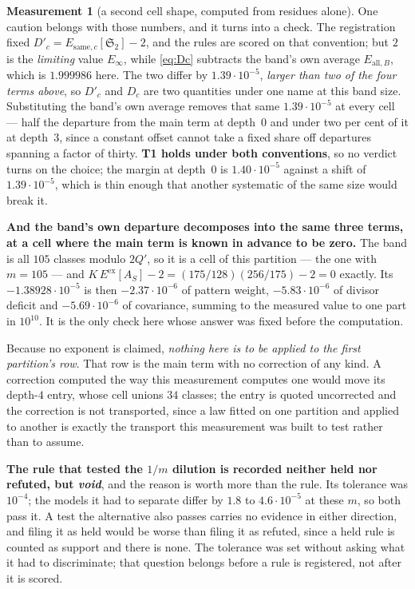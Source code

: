 \documentclass[11pt,a4paper]{article}
\theoremstyle{plain}
\theoremstyle{definition}
\newtheorem{measurement}[theorem]{Measurement}
\theoremstyle{remark}
\renewcommand{\SS}{\mathfrak{S}}
\begin{document}
\begin{measurement}[a second cell shape, computed from residues alone]
One caution belongs with those numbers, and it turns into a check. The
registration fixed $D'_c=E_{\mathrm{same},c}[\SS_2]-2$, and the rules
are scored on that convention; but $2$ is the \emph{limiting} value
$E_\infty$, while \eqref{eq:Dc} subtracts the band's own average
$E_{\mathrm{all},B}$, which is $1.999986$ here. The two differ by
$1.39\cdot10^{-5}$, \emph{larger than two of the four terms above}, so
$D'_c$ and $D_c$ are two quantities under one name at this band size.
Substituting the band's own average removes that same
$1.39\cdot10^{-5}$ at every cell --- half the departure from the main
term at depth~$0$ and under two per cent of it at depth~$3$, since a
constant offset cannot take a fixed share off departures spanning a
factor of thirty. \textbf{T1 holds under both conventions}, so no
verdict turns on the choice; the margin at depth~$0$ is
$1.40\cdot10^{-5}$ against a shift of $1.39\cdot10^{-5}$, which is thin
enough that another systematic of the same size would break it.

\textbf{And the band's own departure decomposes into the same three
terms, at a cell where the main term is known in advance to be zero.}
The band is all $105$ classes modulo $2Q'$, so it is a cell of this
partition --- the one with $m=105$ --- and
$K\,E^{\mathrm{ex}}[A_S]-2=(175/128)(256/175)-2=0$ exactly. Its
$-1.38928\cdot10^{-5}$ is then $-2.37\cdot10^{-6}$ of pattern weight,
$-5.83\cdot10^{-6}$ of divisor deficit and $-5.69\cdot10^{-6}$ of
covariance, summing to the measured value to one part in $10^{10}$.
It is the only check here whose answer was fixed before the
computation.

Because no exponent is claimed, \emph{nothing here is to be applied to
the first partition's row}. That row is the main term with no
correction of any kind. A correction computed the way this measurement
computes one would move its depth-$4$ entry, whose cell unions
$34$ classes; the entry is quoted uncorrected and the correction is not
transported, since a law fitted on one partition and applied to another
is exactly the transport this measurement was built to test rather than
to assume.

\textbf{The rule that tested the $1/m$ dilution is recorded neither
held nor refuted, but \emph{void}}, and the reason is worth more than
the rule. Its tolerance was $10^{-4}$; the models it had to separate
differ by $1.8$ to $4.6\cdot10^{-5}$ at these $m$, so both pass it. A
test the alternative also passes carries no evidence in either
direction, and filing it as held would be worse than filing it as
refuted, since a held rule is counted as support and there is none. The
tolerance was set without asking what it had to discriminate; that
question belongs before a rule is registered, not after it is scored.
\end{measurement}
\end{document}
